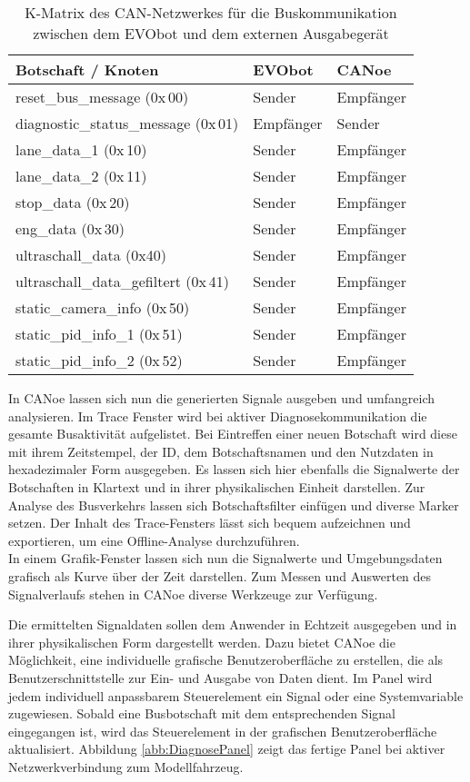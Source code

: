 \begin{table}[!htb]
	\centering
	\caption{K-Matrix des CAN-Netzwerkes für die Buskommunikation zwischen dem EVObot und dem externen Ausgabegerät}
	\footnotesize
	\renewcommand{\arraystretch}{1.3}
	\begin{tabular}{l |l l}
		\toprule
		Botschaft / Knoten & EVObot & CANoe \\
		\midrule
		reset\_bus\_message (0x\,00) & Sender & Empfänger \\
		diagnostic\_status\_message (0x\,01) & Empfänger & Sender \\
		lane\_data\_1 (0x\,10) & Sender & Empfänger \\
		lane\_data\_2 (0x\,11) & Sender & Empfänger \\
		stop\_data (0x\,20) & Sender & Empfänger \\
		eng\_data (0x\,30) & Sender & Empfänger \\
		ultraschall\_data (0x40) & Sender & Empfänger \\
		ultraschall\_data\_gefiltert (0x\,41) & Sender & Empfänger \\
		static\_camera\_info (0x\,50) & Sender & Empfänger \\
		static\_pid\_info\_1 (0x\,51) & Sender & Empfänger \\
		static\_pid\_info\_2 (0x\,52) & Sender & Empfänger \\
		\bottomrule
	\end{tabular}
	\label{tab:KMatrixEVObot}
\end{table}

In CANoe lassen sich nun die generierten Signale ausgeben und umfangreich analysieren. Im Trace Fenster wird bei aktiver Diagnosekommunikation die gesamte Busaktivität aufgelistet. Bei Eintreffen einer neuen Botschaft wird diese mit ihrem Zeitstempel, der ID, dem Botschaftsnamen und den Nutzdaten in hexadezimaler Form ausgegeben. Es lassen sich hier ebenfalls die Signalwerte der Botschaften in Klartext und in ihrer physikalischen Einheit darstellen. Zur Analyse des Busverkehrs lassen sich Botschaftsfilter einfügen und diverse Marker setzen. Der Inhalt des Trace-Fensters lässt sich bequem aufzeichnen und exportieren, um eine Offline-Analyse durchzuführen. \\
In einem Grafik-Fenster lassen sich nun die Signalwerte und Umgebungsdaten grafisch als Kurve über der Zeit darstellen. Zum Messen und Auswerten des Signalverlaufs stehen in CANoe diverse Werkzeuge zur Verfügung.

Die ermittelten Signaldaten sollen dem Anwender in Echtzeit ausgegeben und in ihrer physikalischen Form dargestellt werden. Dazu bietet CANoe die Möglichkeit, eine individuelle grafische Benutzeroberfläche zu erstellen, die als Benutzerschnittstelle zur Ein- und Ausgabe von Daten dient. Im Panel wird jedem individuell anpassbarem Steuerelement ein Signal oder eine Systemvariable zugewiesen. Sobald eine Busbotschaft mit dem entsprechenden Signal eingegangen ist, wird das Steuerelement in der grafischen Benutzeroberfläche aktualisiert. Abbildung \ref{abb:DiagnosePanel} zeigt das fertige Panel bei aktiver Netzwerkverbindung zum Modellfahrzeug.

